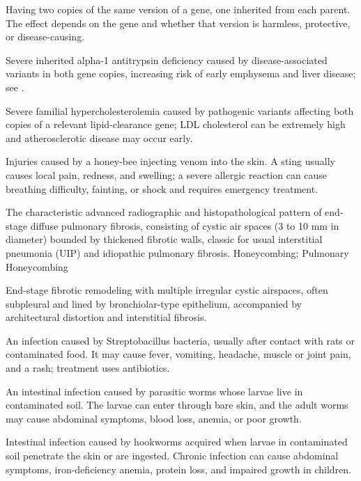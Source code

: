  Having two copies of the same version of a gene, one inherited from each parent. The effect depends on the gene and whether that version is harmless, protective, or disease-causing.

 Severe inherited alpha-1 antitrypsin deficiency caused by disease-associated variants in both gene copies, increasing risk of early emphysema and liver disease; see .

 Severe familial hypercholesterolemia caused by pathogenic variants affecting both copies of a relevant lipid-clearance gene; LDL cholesterol can be extremely high and atherosclerotic disease may occur early.

 Injuries caused by a honey-bee injecting venom into the skin. A sting usually causes local pain, redness, and swelling; a severe allergic reaction can cause breathing difficulty, fainting, or shock and requires emergency treatment.

 The characteristic advanced radiographic and histopathological pattern of end-stage diffuse pulmonary fibrosis, consisting of cystic air spaces (3 to 10 mm in diameter) bounded by thickened fibrotic walls, classic for usual interstitial pneumonia (UIP) and idiopathic pulmonary fibrosis.
\synonyms
Honeycombing; Pulmonary Honeycombing

 End-stage fibrotic remodeling with multiple irregular cystic airspaces, often subpleural and lined by bronchiolar-type epithelium, accompanied by architectural distortion and interstitial fibrosis.

 An infection caused by Streptobacillus bacteria, usually after contact with rats or contaminated food. It may cause fever, vomiting, headache, muscle or joint pain, and a rash; treatment uses antibiotics.

 An intestinal infection caused by parasitic worms whose larvae live in contaminated soil. The larvae can enter through bare skin, and the adult worms may cause abdominal symptoms, blood loss, anemia, or poor growth.

 Intestinal infection caused by hookworms acquired when larvae in contaminated soil
penetrate the skin or are ingested. Chronic infection can cause abdominal symptoms,
iron-deficiency anemia, protein loss, and impaired growth in children.

